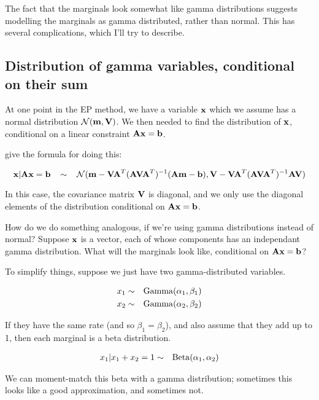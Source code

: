 \documentclass[12]{article}
\begin{document}
The fact that the marginals look somewhat like gamma distributions suggests
modelling the marginals as gamma distributed, rather than normal. This has
several complications, which I'll try to describe.

\subsection*{Distribution of gamma variables, conditional on their sum}

At one point in the EP method,
we have a variable ${\bf x}$ which we assume has a normal
distribution $\mathcal{N}({\bf m},{\bf V})$.
We then needed to find the distribution of ${\bf x}$, conditional
on a linear constraint ${\bf Ax = b}$.

\cite{cseke_approximate_2011} give the formula for doing this:

\[
{\bf x}|{\bf Ax = b} \hspace{3mm} \sim \hspace{3mm} \mathcal{N}({\bf m - VA}^T ({\bf AVA}^T)^{-1} ({\bf Am - b}), {\bf V - VA}^T ({\bf AVA}^T )^{-1}{\bf AV})
\]

In this case, the covariance matrix ${\bf V}$ is diagonal, and we only use the diagonal
elements of the distribution conditional on ${\bf Ax} = {\bf b}$.

How do we do something analogous, if we're using gamma distributions instead of
normal? Suppose ${\bf x}$ is a vector, each of whose components has an independant
gamma distribution. What will the marginals look like, conditional on ${\bf Ax} = {\bf b}$?

To simplify things, suppose we just have two gamma-distributed variables. 

\begin{eqnarray*}
x_1 & \sim & {\rm Gamma}(\alpha_1, \beta_1) \\
x_2 & \sim & {\rm Gamma}(\alpha_2, \beta_2) \\
\end{eqnarray*}

If they have the same rate (and so $\beta_1 = \beta_2$), and also assume that they
add up to 1, then each marginal is a beta distribution.

\begin{eqnarray*}
x_1 | x_1 + x_2 = 1 & \sim & {\rm Beta}(\alpha_1, \alpha_2)
\end{eqnarray*}

We can moment-match this beta with a gamma distribution; sometimes this looks like
a good approximation, and sometimes not.
\end{document}
